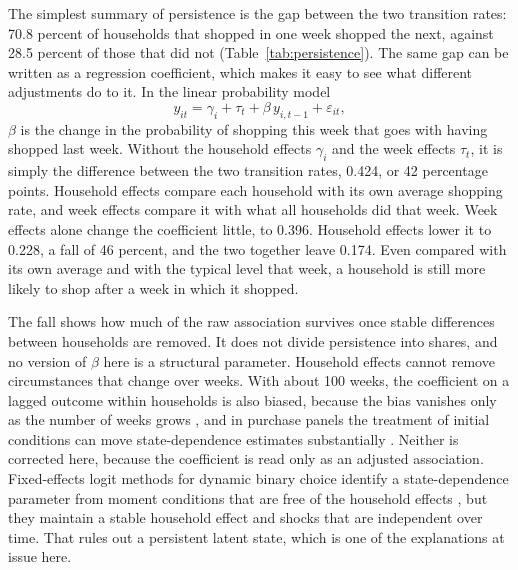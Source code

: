 \documentclass[11pt]{article}
\begin{document}
The simplest summary of persistence is the gap between the two transition rates: 70.8
percent of households that shopped in one week shopped the next, against 28.5 percent of
those that did not (Table~\ref{tab:persistence}). The same gap can be written as a regression
coefficient, which makes it easy to see what different adjustments do to it. In the linear
probability model
\begin{equation}
y_{it} = \gamma_i + \tau_t + \beta\, y_{i,t-1} + \varepsilon_{it},
\label{eq:twfe}
\end{equation}
$\beta$ is the change in the probability of shopping this week that goes with having shopped
last week. Without the household effects $\gamma_i$ and the week effects $\tau_t$, it is
simply the difference between the two transition rates, 0.424, or 42 percentage points.
Household effects compare each household with its own average shopping rate, and week effects
compare it with what all households did that week. Week effects alone change the coefficient
little, to 0.396. Household effects lower it to 0.228, a fall of 46 percent, and the two
together leave 0.174. Even compared with its own average and with the typical level that
week, a household is still more likely to shop after a week in which it shopped.

The fall shows how much of the raw association survives once stable differences between
households are removed. It does not divide persistence into shares, and no version of
$\beta$ here is a structural parameter. Household effects cannot remove circumstances that
change over weeks. With about 100 weeks, the coefficient on a lagged outcome within
households is also biased, because the bias vanishes only as the number of weeks grows
\citep{nickell}, and in purchase panels the
treatment of initial conditions can move state-dependence estimates substantially
\citep{simonov2020}. Neither is corrected here, because the coefficient is read only as an
adjusted association. Fixed-effects logit methods for dynamic binary choice identify a
state-dependence parameter from moment conditions that are free of the household effects
\citep{honore_kyriazidou,honore_weidner2025}, but they maintain a stable household effect and
shocks that are independent over time. That rules out a persistent latent state, which is one of
the explanations at issue here.
\end{document}
